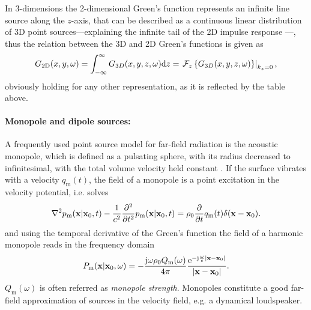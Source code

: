 \vspace{3mm}
In 3-dimensions the 2-dimensional Green's function represents an infinite line source along the $z$-axis, that can be described as a continuous linear distribution of 3D point sources---explaining the infinite tail of the 2D impulse response%
---, thus the relation between the 3D and 2D Green's functions is given as
\begin{equation}
G_{2\mathrm{D}}(x,y,\omega) = \int_{-\infty}^{\infty} G_{3D}(x,y,z,\omega) \mathrm{d} z = \left. \mathcal{F}_{z}\left\{ G_{3D}(x,y,z,\omega) \right\}\right|_{k_z = 0},
\end{equation} 
obviously holding for any other representation, as it is reflected by the table above.

\paragraph{Monopole and dipole sources:\\} 
A frequently used point source model for far-field radiation is the acoustic monopole, which is defined as a pulsating sphere, with its radius decreased to infinitesimal, with the total volume velocity held constant \cite{Howe2007}. If the surface vibrates with a velocity $q_{\mathrm{m}}(t)$, the field of a monopole is a point excitation in the velocity potential, i.e. solves
\begin{equation}
\nabla^2 p_{\mathrm{m}}(\mathbf{x}|\mathbf{x}_0,t) - 	\frac{1}{c^2}\frac{\partial^2}{\partial t^2}p_{\mathrm{m}}(\mathbf{x}|\mathbf{x}_0,t) = \rho_0 \frac{\partial}{\partial t} q_{\mathrm{m}}(t)\delta(\mathbf{x}-\mathbf{x}_0).
\end{equation}
and using the temporal derivative of the Green's function the field of a harmonic monopole reads in the frequency domain
\begin{equation}
P_{\mathrm{m}}(\mathbf{x}|\mathbf{x}_0,\omega) = -\frac{\mathrm{j} \omega \rho_0 Q_{\mathrm{m}}(\omega)}{4\pi}\frac{\mathrm{e}^{-\mathrm{j} \frac{\omega}{c}|\mathbf{x}-\mathbf{x}_0|}}{|\mathbf{x}-\mathbf{x}_0|}.
\end{equation}
$Q_{\mathrm{m}}(\omega)$ is often referred as \emph{monopole strength}. Monopoles constitute a good far-field approximation of sources in the velocity field, e.g. a dynamical loudspeaker. %

